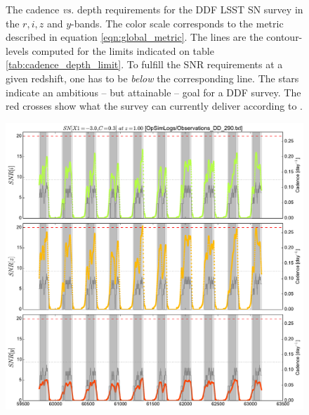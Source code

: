 \documentclass[\docopts]{\docclass}
\begin{document}
\begin{figure}
\begin{center}
\caption{The cadence {\em vs.} depth requirements for the DDF LSST SN
  survey in the $r,i,z$ and $y$-bands. The color scale corresponds to
  the metric described in equation \ref{eqn:global_metric}.  The lines are
  the contour-levels computed for the limits indicated on table
  \ref{tab:cadence_depth_limit}. To fulfill the SNR requirements at a
  given redshift, one has to be {\em below} the corresponding
  line. The stars indicate an ambitious -- but attainable -- goal for
  a DDF survey.  The red crosses show what the survey can currently
  deliver according to . }
\label{fig:m5_cadence_limits_ddf}
\end{center}
\end{figure}



\begin{figure}[t]
  \begin{center}
    \includegraphics[width=\linewidth]{metric_DD_290.pdf}
    \caption{}
  \end{center}
\end{figure}
\end{document}
